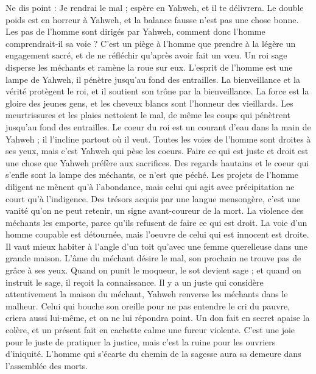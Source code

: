 \begin{multicols}{2}
Ne dis point : Je rendrai le mal ; espère en Yahweh, et il te délivrera.
Le double poids est en horreur à Yahweh, et la balance fausse n'est pas une chose bonne.
Les pas de l'homme sont dirigés par Yahweh, comment donc l'homme comprendrait-il sa voie ?
C'est un piège à l'homme que prendre à la légère un engagement sacré, et de ne réfléchir qu'après avoir fait un vœu.
Un roi sage disperse les méchants et ramène la roue sur eux.
L'esprit de l'homme est une lampe de Yahweh, il pénètre jusqu'au fond des entrailles.
La bienveillance et la vérité protègent le roi, et il soutient son trône par la bienveillance.
La force est la gloire des jeunes gens, et les cheveux blancs sont l'honneur des vieillards.
Les meurtrissures et les plaies nettoient le mal, de même les coups qui pénètrent jusqu'au fond des entrailles.
\VerseOne{}Le coeur du roi est un courant d'eau dans la main de Yahweh ; il l'incline partout où il veut.
Toutes les voies de l'homme sont droites à ses yeux, mais c'est Yahweh qui pèse les coeurs.
Faire ce qui est juste et droit est une chose que Yahweh préfère aux sacrifices.
Des regards hautains et le coeur qui s'enfle sont la lampe des méchants, ce n'est que péché.
Les projets de l'homme diligent ne mènent qu'à l'abondance, mais celui qui agit avec précipitation ne court qu'à l'indigence.
Des trésors acquis par une langue mensongère, c'est une vanité qu'on ne peut retenir, un signe avant-coureur de la mort.
La violence des méchants les emporte, parce qu'ils refusent de faire ce qui est droit.
La voie d'un homme coupable est détournée, mais l'oeuvre de celui qui est innocent est droite.
Il vaut mieux habiter à l'angle d'un toit qu'avec une femme querelleuse dans une grande maison.
L'âme du méchant désire le mal, son prochain ne trouve pas de grâce à ses yeux.
Quand on punit le moqueur, le sot devient sage ; et quand on instruit le sage, il reçoit la connaissance.
Il y a un juste qui considère attentivement la maison du méchant, Yahweh renverse les méchants dans le malheur.
Celui qui bouche son oreille pour ne pas entendre le cri du pauvre, criera aussi lui-même, et on ne lui répondra point.
Un don fait en secret apaise la colère, et un présent fait en cachette calme une fureur violente.
C'est une joie pour le juste de pratiquer la justice, mais c'est la ruine pour les ouvriers d'iniquité.
L'homme qui s'écarte du chemin de la sagesse aura sa demeure dans l'assemblée des morts.

\end{multicols}
